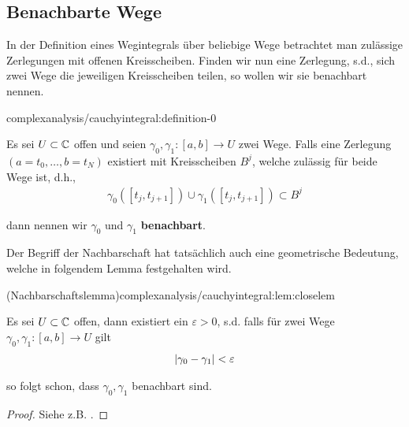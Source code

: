 \subsection{Benachbarte Wege}
\label{\detokenize{complexanalysis/cauchyintegral:benachbarte-wege}}
\par
In der Definition eines Wegintegrals über beliebige Wege betrachtet man zulässige Zerlegungen mit offenen Kreisscheiben. Finden wir nun eine Zerlegung, s.d., sich zwei Wege die jeweiligen Kreisscheiben teilen, so wollen wir sie benachbart nennen.
\begin{definition}{}{complexanalysis/cauchyintegral:definition-0}



\par
Es sei \(U\subset \mathbb{C}\) offen und seien \(\gamma_0,\gamma_1:[a,b]\to U\) zwei Wege. Falls eine Zerlegung \((a=t_0,\ldots,b=t_N)\) existiert mit Kreisscheiben \(B^j\), welche zulässig für beide Wege ist, d.h.,
\begin{align*}
\gamma_0([t_j, t_{j+1}])\cup \gamma_1([t_j,t_{j+1}]) \subset B^j
\end{align*}
\par
dann nennen wir \(\gamma_0\) und \(\gamma_1\) \textbf{benachbart}.
\end{definition}

\par
Der Begriff der Nachbarschaft hat tatsächlich auch eine geometrische Bedeutung, welche in folgendem Lemma festgehalten wird.
\begin{lemma}{(Nachbarschaftslemma)}{complexanalysis/cauchyintegral:lem:closelem}



\par
Es sei \(U\subset\mathbb{C}\) offen, dann existiert ein \(\varepsilon>0\), s.d. falls für zwei Wege \(\gamma_0,\gamma_1:[a,b]\to U\) gilt
\begin{align*}
\vert \gamma_0 - \gamma_1 \vert < \varepsilon
\end{align*}
\par
so folgt schon, dass \(\gamma_0,\gamma_1\) benachbart sind.
\end{lemma}

\begin{proof}
 Siehe z.B. \cite{Nee17}.
\end{proof}

